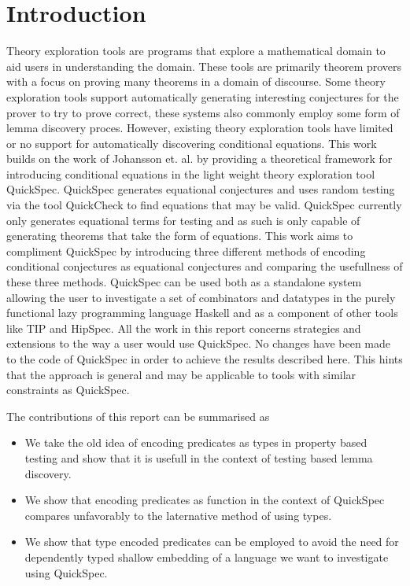 \section{Introduction}
Theory exploration tools are programs that
explore a mathematical domain to aid users in
understanding the domain. %
These tools are primarily theorem provers with a focus
on proving many theorems in a domain of discourse.
Some theory exploration tools support automatically generating
interesting conjectures for the prover to try to prove correct,
these systems also commonly employ some form of lemma discovery proces\cite{heras2013}.
However, existing theory exploration tools have limited or no
support for automatically discovering conditional equations. %
This work builds on the work of Johansson et. al. \cite{Johansson2014}
by providing a theoretical framework for introducing conditional
equations in the light weight theory exploration tool QuickSpec.\cite{Claessen2010} 
QuickSpec generates equational conjectures and uses random testing via the tool QuickCheck \cite{Claessen2000}
to find equations that may be valid. QuickSpec currently only generates
equational terms for testing and as such is only capable of generating
theorems that take the form of equations. 
This work aims to compliment QuickSpec by introducing three different methods
of encoding conditional conjectures as equational conjectures and comparing
the usefullness of these three methods. QuickSpec can be used both as a standalone
system allowing the user to investigate a set of combinators and datatypes in the
purely functional lazy programming language Haskell and as a component of other tools %
like TIP\cite{Rosen2015} and HipSpec\cite{Claessen2013}. 
All the work in this report concerns strategies and extensions to the way a user would
use QuickSpec. No changes have been made to the code of QuickSpec in order to
achieve the results described here. This hints that the approach is general
and may be applicable to tools with similar constraints as QuickSpec.

The contributions of this report can be summarised as
\begin{itemize}
    \item We take the old idea of encoding predicates as types
        in property based testing and show that it is usefull in
        the context of testing based lemma discovery.

    \item We show that encoding predicates as function in the context
        of QuickSpec compares unfavorably to the laternative method
        of using types.

    \item We show that type encoded predicates can be employed to avoid 
        the need for dependently typed shallow embedding of a language
        we want to investigate using QuickSpec.
\end{itemize}
